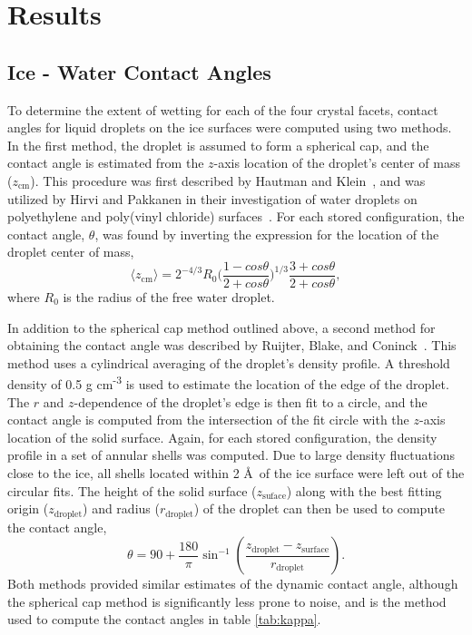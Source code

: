 \section{Results}
\subsection{Ice - Water Contact Angles}
To determine the extent of wetting for each of the four crystal
facets, contact angles for liquid droplets on the ice surfaces were
computed using two methods.  In the first method, the droplet is
assumed to form a spherical cap, and the contact angle is estimated
from the $z$-axis location of the droplet's center of mass
($z_\mathrm{cm}$).  This procedure was first described by Hautman and
Klein~\cite{Hautman1991}, and was utilized by Hirvi and Pakkanen in
their investigation of water droplets on polyethylene and poly(vinyl
chloride) surfaces~\cite{Hirvi2006}. For each stored configuration, the
contact angle, $\theta$, was found by inverting the expression for the
location of the droplet center of mass,
\begin{equation}\label{contact_1}
\langle z_\mathrm{cm}\rangle = 2^{-4/3}R_{0}\bigg(\frac{1-cos\theta}{2+cos\theta}\bigg)^{1/3}\frac{3+cos\theta}{2+cos\theta} ,
\end{equation}
where $R_{0}$ is the radius of the free water droplet. 

In addition to the spherical cap method outlined above, a second
method for obtaining the contact angle was described by Ruijter,
Blake, and Coninck~\cite{Ruijter1999}.  This method uses a cylindrical
averaging of the droplet's density profile.  A threshold density of
0.5 g cm\textsuperscript{-3} is used to estimate the location of the
edge of the droplet.  The $r$ and $z$-dependence of the droplet's edge
is then fit to a circle, and the contact angle is computed from the
intersection of the fit circle with the $z$-axis location of the solid
surface.  Again, for each stored configuration, the density profile in
a set of annular shells was computed. Due to large density
fluctuations close to the ice, all shells located within 2 \AA\ of the
ice surface were left out of the circular fits.  The height of the
solid surface ($z_\mathrm{suface}$) along with the best fitting origin
($z_\mathrm{droplet}$) and radius ($r_\mathrm{droplet}$) of the
droplet can then be used to compute the contact angle,
\begin{equation}
\theta =  90 + \frac{180}{\pi} \sin^{-1}\left(\frac{z_\mathrm{droplet} -
  z_\mathrm{surface}}{r_\mathrm{droplet}} \right).
\end{equation}
Both methods provided similar estimates of the dynamic contact angle,
although the spherical cap method is significantly less prone to
noise, and is the method used to compute the contact angles in table
\ref{tab:kappa}.

